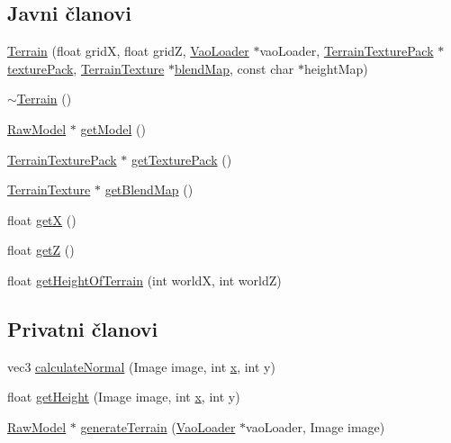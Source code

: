 \subsection*{Javni članovi}
\begin{DoxyCompactItemize}
\item 
\hyperlink{classterrain_1_1Terrain_a3361d2b8405cb829d0b851a944bce94b}{Terrain} (float gridX, float gridZ, \hyperlink{classcore_1_1VaoLoader}{Vao\+Loader} $\ast$vao\+Loader, \hyperlink{classtexture_1_1TerrainTexturePack}{Terrain\+Texture\+Pack} $\ast$\hyperlink{classterrain_1_1Terrain_a6f9e86bd4c98ec61c9588b9f2b57fb75}{texture\+Pack}, \hyperlink{classtexture_1_1TerrainTexture}{Terrain\+Texture} $\ast$\hyperlink{classterrain_1_1Terrain_a48d20417020f61e62bb5d3a497c62a57}{blend\+Map}, const char $\ast$height\+Map)
\item 
\hyperlink{classterrain_1_1Terrain_a6aa3821700c2010298c1ad9f83971670}{$\sim$\+Terrain} ()
\item 
\hyperlink{classmodel_1_1RawModel}{Raw\+Model} $\ast$ \hyperlink{classterrain_1_1Terrain_a336c5efe16ff0fd81c8b6b6f00b9ba08}{get\+Model} ()
\item 
\hyperlink{classtexture_1_1TerrainTexturePack}{Terrain\+Texture\+Pack} $\ast$ \hyperlink{classterrain_1_1Terrain_a6b6100654d9bb6f5f5ea004cc5bf95f4}{get\+Texture\+Pack} ()
\item 
\hyperlink{classtexture_1_1TerrainTexture}{Terrain\+Texture} $\ast$ \hyperlink{classterrain_1_1Terrain_ae4d64fa4f81168a02887127491572cef}{get\+Blend\+Map} ()
\item 
float \hyperlink{classterrain_1_1Terrain_a7498906e811d059461be143d7323a6f9}{getX} ()
\item 
float \hyperlink{classterrain_1_1Terrain_ab348a1c250df237f2a60f59bf8797dc0}{getZ} ()
\item 
float \hyperlink{classterrain_1_1Terrain_afd074b9a18254b81abb89d29406f90e5}{get\+Height\+Of\+Terrain} (int worldX, int worldZ)
\end{DoxyCompactItemize}
\subsection*{Privatni članovi}
\begin{DoxyCompactItemize}
\item 
vec3 \hyperlink{classterrain_1_1Terrain_a2864540ccf7224830c0bbf2961d207bb}{calculate\+Normal} (Image image, int \hyperlink{classterrain_1_1Terrain_aec56d6e8219539617090b8e99b89be29}{x}, int y)
\item 
float \hyperlink{classterrain_1_1Terrain_a0707a64c79d89cfc358670651855cba1}{get\+Height} (Image image, int \hyperlink{classterrain_1_1Terrain_aec56d6e8219539617090b8e99b89be29}{x}, int y)
\item 
\hyperlink{classmodel_1_1RawModel}{Raw\+Model} $\ast$ \hyperlink{classterrain_1_1Terrain_aadecc14ee7c1c340c54c6960d489f1da}{generate\+Terrain} (\hyperlink{classcore_1_1VaoLoader}{Vao\+Loader} $\ast$vao\+Loader, Image image)
\end{DoxyCompactItemize}

